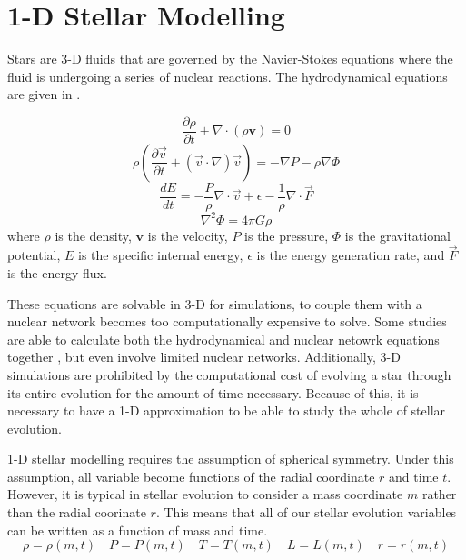 \section{1-D Stellar Modelling}

Stars are 3-D fluids that are governed by the Navier-Stokes equations where the fluid is undergoing a series of nuclear reactions. 
The hydrodynamical equations are given in \cite{kippenhahnStellarStructureEvolution2013}.

\begin{equation}
\frac{\partial \rho}{\partial t} + \nabla \cdot (\rho \mathbf{v}) = 0
\label{eq:continuity}
\end{equation}
\begin{equation}
\rho \left( \frac{\partial \vec{v}}{\partial t} + (\vec{v} \cdot \nabla)\vec{v} \right) = -\nabla P - \rho \nabla \Phi
\label{eq:momentum}
\end{equation}
\begin{equation}
\frac{d E}{d t} = -\frac{P}{\rho} \nabla \cdot \vec{v} + \epsilon - \frac{1}{\rho} \nabla \cdot \vec{F}
\label{eq:energy}
\end{equation}
\begin{equation}
\nabla^2 \Phi = 4 \pi G \rho
\label{eq:poisson}
\end{equation}
where $\rho$ is the density, $\mathbf{v}$ is the velocity, $P$ is the pressure, $\Phi$ is the gravitational potential, $E$ is the specific internal energy, $\epsilon$ is the energy generation rate, and $\vec{F}$ is the energy flux.

These equations are solvable in 3-D for simulations, to couple them with a nuclear network becomes too computationally expensive to solve.
Some studies are able to calculate both the hydrodynamical and nuclear netowrk equations together \cite{rizzutiStellarEvolutionConvection2024}, but even involve limited nuclear networks.
Additionally, 3-D simulations are prohibited by the computational cost of evolving a star through its entire evolution for the amount of time necessary.
Because of this, it is necessary to have a 1-D approximation to be able to study the whole of stellar evolution.

1-D stellar modelling requires the assumption of spherical symmetry.
Under this assumption, all variable become functions of the radial coordinate $r$ and time $t$.
However, it is typical in stellar evolution to consider a mass coordinate $m$ rather than the radial coorinate $r$.
This means that all of our stellar evolution variables can be written as a function of mass and time.
\[
\rho = \rho(m,t) \quad P = P(m,t) \quad T = T(m,t) \quad L = L(m,t) \quad r = r(m,t)
\]

